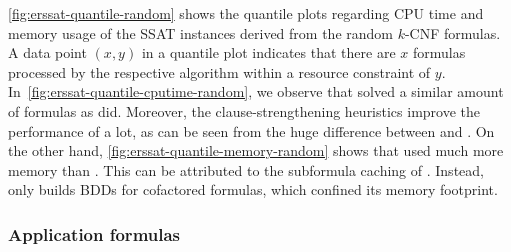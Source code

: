 \cref{fig:erssat-quantile-random} shows the quantile plots regarding CPU time and memory usage
of the SSAT instances derived from the random $k$-CNF formulas.
A data point $(x,y)$ in a quantile plot indicates that
there are $x$ formulas processed by the respective algorithm within a resource constraint of $y$.
In~\cref{fig:erssat-quantile-cputime-random},
we observe that \erssat solved a similar amount of formulas as \dcssat did.
Moreover, the clause-strengthening heuristics improve the performance of \erssat a lot,
as can be seen from the huge difference between \erssat and \erssatb.
On the other hand,
\cref{fig:erssat-quantile-memory-random} shows that \dcssat used much more memory than \erssat.
This can be attributed to the subformula caching of \dcssat.
Instead, \erssat only builds BDDs for cofactored formulas, which confined its memory footprint.

\subsubsection{Application formulas}

